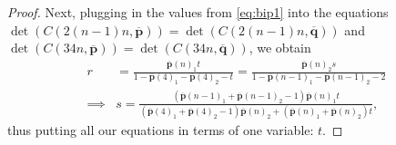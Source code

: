 \documentclass[11pt]{amsart}
\theoremstyle{definition}
\theoremstyle{remark}
\begin{document}
\begin{proof}
    Next, plugging in the values from \cref{eq:bip1} into the equations $\det(C(2(n-1)n,\overline{\mathbf{p}}))=\det(C(2(n-1)n,\overline{\mathbf{q}}))$ and $\det(C(34n,\overline{\mathbf{p}}))=\det(C(34n,\overline{\mathbf{q}}))$, we obtain
    \begin{equation}\label{eq:bip2}
    \begin{split}
        r&=\frac{\overline{\mathbf{p}}(n)_1t}{1-\overline{\mathbf{p}}(4)_1-\overline{\mathbf{p}}(4)_2-t}=\frac{\overline{\mathbf{p}}(n)_2s}{1-\overline{\mathbf{p}}(n-1)_1-\overline{\mathbf{p}}(n-1)_2-2} \\
        \implies&s=\frac{(\overline{\mathbf{p}}(n-1)_1+\overline{\mathbf{p}}(n-1)_2-1)\overline{\mathbf{p}}(n)_1t}{(\overline{\mathbf{p}}(4)_1+\overline{\mathbf{p}}(4)_2-1)\overline{\mathbf{p}}(n)_2+(\overline{\mathbf{p}}(n)_1+\overline{\mathbf{p}}(n)_2)t},
    \end{split}
    \end{equation}
    thus putting all our equations in terms of one variable: $t$.


\end{proof}
\end{document}
